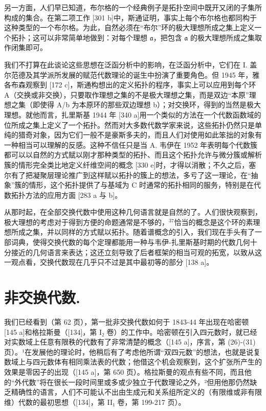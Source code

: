 另一方面，人们早已知道，布尔格的一个经典例子是拓扑空间中既开又闭的子集所构成的集合。在第二项工作 {[}301 b{]}中，斯通证明，事实上每个布尔格也都同构于这种类型的一个布尔格。为此，自然必须在“布尔”环的极大理想所成之集上定义一个拓扑；这可以非常简单地做到：对每个理想 \(\mathfrak{a}\)，把包含 \(\mathfrak{a}\) 的极大理想所成之集取作闭集即可。

我们不打算在此谈论这些思想在泛函分析中的影响，在泛函分析中，它们在 I. 盖尔范德及其学派所发展的赋范代数理论的诞生中扮演了重要角色。但 1945 年，雅各布森观察到 {[}172 c{]}，斯通构想出的定义拓扑的程序，事实上可以应用到每个环 A（交换或非交换），只要取作理想之集的不是极大理想之集，而是双边“本原”理想之集（即使得 A/b 为本原环的那些双边理想 b）；对交换环，得到的当然是极大理想。就他而言，扎里斯基 1944 年 {[}340 a{]}用一个类似的方法在一个代数函数域的位所成之集上定义了一个拓扑。然而对大多数代数学家来说，这些拓扑仍然只是单纯的猎奇对象，因为它们一般不是豪斯多夫的，而且人们对使用如此笨拙的对象有一种相当可以理解的反感。这种不信任只是当 A. 韦伊在 1952 年表明每个代数簇都可以以自然的方式赋以刚才那种类型的拓扑、而且这个拓扑允许与微分簇或解析簇的情形完全类比地定义纤维空间的概念 {[}330 e{]}时，才得以消散；不久之后，塞尔有了把凝聚层理论推广到这样赋以拓扑的簇上的想法，多亏了这一理论，在“抽象”簇的情形，这个拓扑提供了与基域为 C 时通常的拓扑相同的服务，特别是在代数拓扑方法的应用方面 {[}283 a 与 b{]}。

从那时起，在全部交换代数中使用这种几何语言就是自然的了。人们很快观察到，极大理想的考虑对于得到方便的命题通常是不够的，\(^{37}\)恰当的概念是这个环的素理想所成之集，并以同样的方式赋以拓扑。随着谱概念的引入，我们现在手头有了一部词典，使得交换代数的每个定理都能用一种与韦伊-扎里斯基时期的代数几何十分接近的几何语言来表达；这还立刻导致了后者框架的相当可观的拓宽，以致从这一观点看，交换代数现在几乎只不过是其中最初等的部分 {[}138 a{]}。

\chapter{非交换代数.}

我们已经看到（第 62 页），第一批非交换代数如何于 1843-44 年出现在哈密顿 {[}145 a{]}和格拉斯曼（{[}134{]}，第 I₂ 卷）的工作中。哈密顿在引入四元数时，就已经对实数域上任意有限秩的代数有了非常清楚的概念（{[}145 a{]}，序言，第 (26)-(31) 页）。¹在发展他的理论时，他稍后有了考虑他所谓“双四元数”的想法，也就是说复数域上与四元数体有相同乘法表的代数；他借这个机会观察到，这个扩张所产生的效果是零因子的出现（{[}145 a{]}，第 650 页）。格拉斯曼的观点有些不同，而且他的“外代数”将在很长一段时间里或多或少独立于代数理论之外，²但用他那仍然缺乏精确性的语言，人们不可能认不出由生成元和关系组所定义的（有限维或非有限维）代数的最初思想（{[}134{]}，第 II₁ 卷，第 199-217 页）。

